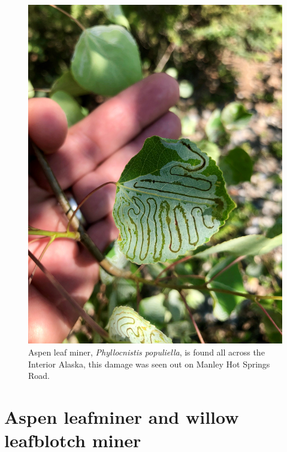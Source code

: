 \begin{figure}[H]
\begin{center}
\vspace{2mm}
\includegraphics[width=\textwidth]{img/aspen_leafminer.jpg}
\caption{Aspen leaf miner, \textit{Phyllocnistis populiella}, is found all across the Interior Alaska, this damage was seen out on Manley Hot Springs Road.}
\label{aspen_leafminer}
\end{center}
\end{figure} 

\section{Aspen leafminer and willow leafblotch miner}

